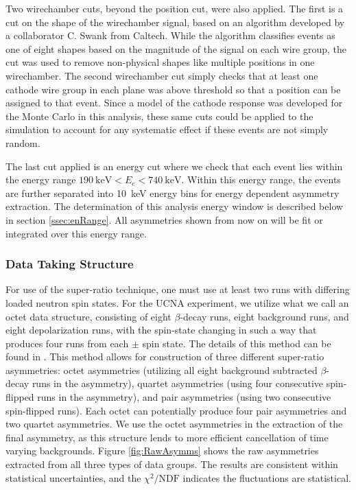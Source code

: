 Two wirechamber cuts, beyond the position cut, were also applied. The first is a cut on the shape of the wirechamber
signal, based on an algorithm developed by a collaborator C. Swank from Caltech. While the
algorithm classifies events as one of eight shapes based on the magnitude of
the signal on each wire group, the cut was used to remove non-physical shapes
like multiple positions in one wirechamber. The second wirechamber
cut simply checks that at least one cathode wire group in each plane was above threshold
so that a position can be assigned to that event.
Since a model of the cathode response was
developed for the Monte Carlo in this analysis, these same cuts could be applied to the
simulation to account for any systematic effect if these events are not simply random.

The last cut applied is an energy cut where we check that each event lies within the
energy range $190\mathrm{~keV} < E_e < 740\mathrm{~keV}$.
Within this energy range, the events are further separated into
10~keV energy bins for energy dependent asymmetry extraction. The determination
of this analysis energy window is described below in section \ref{ssec:enRange}.
All asymmetries shown from now on
will be fit or integrated over this energy range.

\subsubsection{Data Taking Structure}

For use of the super-ratio technique, one must use at least two runs with differing loaded
neutron spin states. For the UCNA experiment, we utilize what we call an octet data structure,
consisting of eight $\beta$-decay runs, eight background runs, and eight depolarization
runs, with the spin-state changing in such a way that produces
four runs from each $\pm$ spin state.
The details of this method can be found in \cite{plaster2012}. This method allows for
construction of three different super-ratio asymmetries: octet asymmetries (utilizing all eight background subtracted
$\beta$-decay runs in the asymmetry), quartet asymmetries (using four consecutive spin-flipped
runs in the asymmetry), and pair asymmetries (using two consecutive spin-flipped runs). Each octet can potentially
produce four pair asymmetries and two quartet asymmetries. We use
the octet asymmetries in the extraction of the final asymmetry, as this structure lends to more
efficient cancellation of time varying backgrounds. Figure \ref{fig:RawAsymms} shows the
raw asymmetries extracted from all three types of data groups. The results are consistent
within statistical uncertainties, and the $\chi^2/\textrm{NDF}$ indicates the fluctuations
are statistical. 

